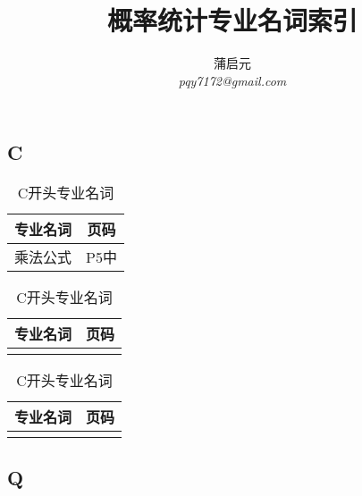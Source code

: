 \documentclass{wx672article}
\title{概率统计专业名词索引}
\author{蒲启元 \\
 \emph{pqy7172@gmail.com}}
\begin{document}
\maketitle{}



\begin{center}
  \section*{C}
\end{center}
\label{sec:c}


 \begin{table}[h!] %
      \centering
        \begin{tabular}[t]{c|c} %
          \hline
          专业名词 &  页码   \\
          \hline
          乘法公式 & P5中 \\
          \hline
        \end{tabular}
        \hfill
        \begin{tabular}[t]{c|c}
          \hline
          专业名词  &  页码  \\
          \hline
           &  \\
          \hline
        \end{tabular}
        \hfill
        \begin{tabular}[t]{c|c}
          \hline
          专业名词 &  页码 \\
          \hline
           &  \\
          \hline
        \end{tabular}
        \caption{C开头专业名词}\label{tabC}
    \end{table}


    \begin{center}
      \section*{Q}
    \end{center}
    \label{sec:}
\end{document}
